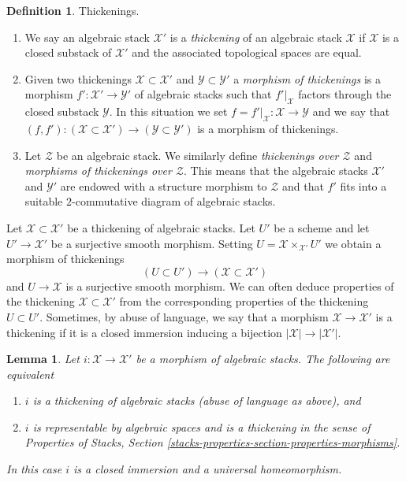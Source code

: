 \documentclass{stacks-project}
\theoremstyle{plain}
\newtheorem{lemma}[subsection]{Lemma}
\theoremstyle{definition}
\newtheorem{definition}[subsection]{Definition}
\theoremstyle{remark}
\numberwithin{equation}{subsection}
\begin{document}
\begin{definition}
\label{definition-thickening}
Thickenings.
\begin{enumerate}
\item We say an algebraic stack $\mathcal{X}'$ is a {\it thickening}
of an algebraic stack $\mathcal{X}$ if $\mathcal{X}$ is a closed substack
of $\mathcal{X}'$ and the associated topological spaces are equal.
\item Given two thickenings $\mathcal{X} \subset \mathcal{X}'$ and
$\mathcal{Y} \subset \mathcal{Y}'$ a {\it morphism of thickenings}
is a morphism $f' : \mathcal{X}' \to \mathcal{Y}'$ of algebraic stacks
such that $f'|_\mathcal{X}$ factors through the closed
substack $\mathcal{Y}$. In this situation we set
$f = f'|_\mathcal{X} : \mathcal{X} \to \mathcal{Y}$ and we say that
$(f, f') : (\mathcal{X} \subset \mathcal{X}') \to
(\mathcal{Y} \subset \mathcal{Y}')$ is a morphism of thickenings.
\item Let $\mathcal{Z}$ be an algebraic stack. We similarly define
{\it thickenings over $\mathcal{Z}$} and
{\it morphisms of thickenings over $\mathcal{Z}$}.
This means that the algebraic stacks
$\mathcal{X}'$ and $\mathcal{Y}'$
are endowed with a structure
morphism to $\mathcal{Z}$ and that $f'$ fits into a suitable
$2$-commutative diagram of algebraic stacks.
\end{enumerate}
\end{definition}

\noindent
Let $\mathcal{X} \subset \mathcal{X}'$ be a thickening of algebraic stacks.
Let $U'$ be a scheme and let $U' \to \mathcal{X}'$ be a surjective smooth
morphism. Setting $U = \mathcal{X} \times_{\mathcal{X}'} U'$ we obtain
a morphism of thickenings
$$
(U \subset U') \longrightarrow (\mathcal{X} \subset \mathcal{X}')
$$
and $U \to \mathcal{X}$ is a surjective smooth morphism. We can often
deduce properties of the thickening $\mathcal{X} \subset \mathcal{X}'$
from the corresponding properties of the thickening $U \subset U'$.
Sometimes, by abuse of language, we say that a morphism
$\mathcal{X} \to \mathcal{X}'$ is a thickening if it is a closed
immersion inducing a bijection $|\mathcal{X}| \to |\mathcal{X}'|$.

\begin{lemma}
\label{lemma-thickening}
Let $i : \mathcal{X} \to \mathcal{X}'$ be a morphism of algebraic stacks.
The following are equivalent
\begin{enumerate}
\item $i$ is a thickening of algebraic stacks (abuse of language as above), and
\item $i$ is representable by algebraic spaces and
is a thickening in the sense of Properties of Stacks, Section
\ref{stacks-properties-section-properties-morphisms}.
\end{enumerate}
In this case $i$ is a closed immersion and a universal homeomorphism.
\end{lemma}
\end{document}
